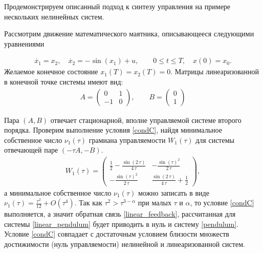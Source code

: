 \documentclass[../main.tex]{subfiles}
\begin{document}
Продемонстрируем описанный подход к синтезу управления на примере нескольких нелинейных систем. 


\begin{pr}
Рассмотрим движение математического маятника, описывающееся следующими уравнениями 

\begin{gather}\label{pendulum}
    \dot{x_1} = x_2, \quad 
    \dot{x_2} = -\sin(x_1) + u, \qquad
    0 \leqslant t \leqslant T, \quad
    x(0) = x_0.
\end{gather}
Желаемое конечное состояние $ x_1(T) = x_2(T) =  0 $. Матрицы линеаризованной в конечной точке системы имеют вид:
\begin{gather}\label{linear_pendulum}
    A = \begin{pmatrix}
        0 & 1\\
        -1 & 0
    \end{pmatrix}, \qquad 
    B = \begin{pmatrix}
        0 \\
        1
    \end{pmatrix}
\end{gather}

Пара $(A,B)$ отвечает стационарной, вполне управляемой системе второго порядка. Проверим выполнение условия \ref{condC}, найдя минимальное собственное число $ \nu_1(\tau) $ грамиана управляемости $W_1(\tau)$ для системы отвечающей паре $(-\tau A, -B) $. 
\begin{gather*}
    W_1(\tau) = \begin{pmatrix}  \frac{1}{2}-\frac{\sin\left(2\,\tau \right)}{4\,\tau } & -\frac{{\sin\left(\tau \right)}^2}{2\,\tau }\\ -\frac{{\sin\left(\tau \right)}^2}{2\,\tau } & \frac{\sin\left(2\,\tau \right)}{4\,\tau }+\frac{1}{2} \end{pmatrix},
\end{gather*}
а минимальное собственное число $ \nu_1(\tau) $ можно записать в виде $\nu_1(\tau) = \frac{\tau ^2}{12}+O(\tau^4) $. Так как $\tau^2  > \tau^{3-\alpha} $ при малых $\tau$ и $\alpha$, то условие \ref{condC} выполняется, а значит обратная связь \eqref{linear_feedback}, рассчитанная для системы \eqref{linear_pendulum}  будет приводить в нуль и систему \eqref{pendulum}.  Условие \ref{condC} совпадает с достаточным условием близости множеств достижимости (нуль управляемости) нелинейной и линеаризованной систем. 


\end{pr}
\end{document}
